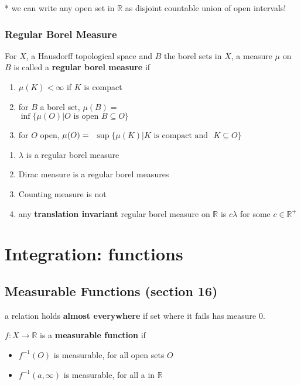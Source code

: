 \documentclass[a4paper, 12pt]{article}
\def\R{\ensuremath{\mathbb{R}}} %
\newcommand{\bt}[1]{\textbf{#1}} %
\newcommand{\gray}[1]{{\leavevmode\color[gray]{0.5}{#1}}} %
\begin{document}
\begin{multicols}{2}
* we can write any open set in $\R$ as disjoint countable union of open intervals!
\subsubsection{Regular Borel Measure}
\label{Regular Borel Measure}
For $X$, a Hausdorff topological space and $B$ the borel sets in $X$, 
a measure $\mu$ on $B$ is called a \bt{regular borel measure} if 
\begin{enumerate}
    \item $\mu(K) < \infty$ if $K$ is compact 
    \item for $B$ a borel set, $\mu(B) =$\\ $\inf \{\mu(O) | O \text{ is open } B \subseteq O\}$ 
    \item for $O$ open, $\mu(O) = \\$  $\sup\{\mu(K) | K \text{ is compact and }$ $K \subseteq O\}$
\end{enumerate}

\begin{enumerate}
    \item $\lambda$ is a regular borel measure
    \item Dirac measure is a regular borel measures
    \item Counting measure is not\\
    \gray{for example $[0, 1]$ is compact, but has infinite measure}
    \item any \bt{translation invariant} regular borel measure on $\R$ is 
    $c \lambda$ for some $c \in \R^+$
\end{enumerate}

\section{Integration: functions}

\subsection{Measurable Functions (section 16)}

a relation holds \bt{almost everywhere} if set where it fails has measure 0.

$f: X \rightarrow \R$ is a \bt{measurable function} if 
\begin{itemize}
    \item $f^{-1}(O)$ is measurable, for all open sets $O$
    \item $f^{-1}(a, \infty)$ is measurable, for all a in $\R$
\end{itemize}


\end{multicols}
\end{document}
